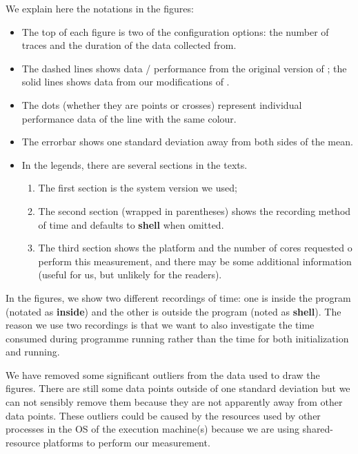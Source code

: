 We explain here the notations in the figures:
\begin{itemize}
	\item The top of each figure is two of the configuration options: the number of traces and the duration of the data collected from.
	\item The dashed lines shows data / performance from the original version of \dpy; the solid lines shows data from our modifications of \dpy.
	\item The dots (whether they are points or crosses) represent individual performance data of the line with the same colour.
	\item The errorbar shows one standard deviation away from both sides of the mean.
	\item In the legends, there are several sections in the texts.
	\begin{enumerate}
		\item The first section is the system version we used; 
		\item The second section (wrapped in parentheses) shows the recording method of time and defaults to \textbf{shell} when omitted.
		\item The third section shows the platform and the number of cores requested o perform this measurement, and there may be some additional information (useful for us, but unlikely for the readers).
	\end{enumerate}
\end{itemize}

In the figures, we show two different recordings of time: one is inside the program (notated as \textbf{inside}) and the other is outside the program (noted as \textbf{shell}). The reason we use two recordings is that we want to also investigate the time consumed during programme running rather than the time for both initialization and running.

We have removed some significant outliers from the data used to draw the figures. There are still some data points outside of one standard deviation but we can not sensibly remove them because they are not apparently away from other data points. These outliers could be caused by the resources used by other processes in the OS of the execution machine(s) because we are using shared-resource platforms to perform our measurement.

